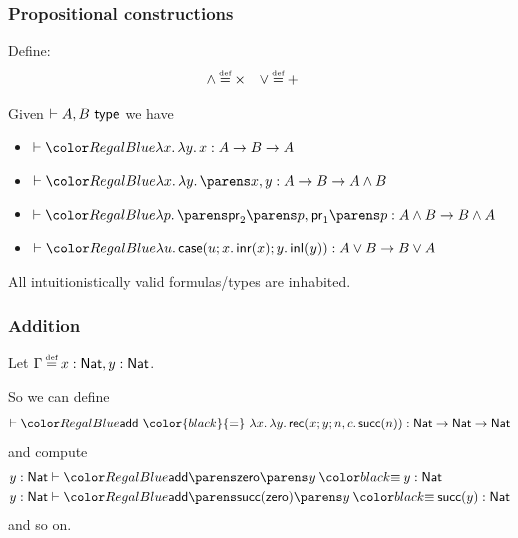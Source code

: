 \documentclass{beamer} %
\begin{document}
\begin{frame}
  \frametitle{Propositional constructions}
  
  \begin{center}
  \end{center}
  Define:
  \begin{align*}
    \land &\defeq \times
    &
    \lor &\defeq +
  \end{align*}
  
  \medskip
  
  Given $\IsTy[]{A, B}[]$ we have
  
  \begin{itemize}
    \item $\IsTm[]{\Lam{x}{\Lam{y}{x}}}{A \to B \to A}$
    \item $\IsTm[]{\Lam{x}{\Lam{y}{\Pair{x}{y}}}}{A \to B \to A \land B}$
    \item $\IsTm[]{\Lam{p}{\Pair{\Proj[2]{p}}{\Proj[1]{p}}}}{A \land B \to B \land A}$
    \item $\IsTm[]{\Lam{u}{\Case{u}{x}{\Inr{x}}{y}{\Inl{y}}}}{A \lor B \to B \lor A}$
  \end{itemize}
  
  \begin{theorem}
    All intuitionistically valid formulas/types are inhabited.
  \end{theorem}
\end{frame}

\begin{frame}
  \frametitle{Addition}
  
  Let $\Gamma \defeq x : \Nat, y : \Nat$.
  \begin{mathpar}
    \small
  \end{mathpar}
  
  So we can define
  \[
    \IsTm[]{\textsf{add}\ {\color{black}{=}}\
      \Lam{x}{\Lam{y}{
        \NatRec{x}{y}{n}{c}{\Succ{n}}
      }}}{\Nat \to \Nat \to \Nat}
  \]
  and compute
  \begin{align*}
    &\IsTm[y : \Nat]{
      \App{\App{\textsf{add}}{\Zero}}{y}
        \deq
      y
    }{\Nat}
    \\
    &\IsTm[y : \Nat]{
      \App{\App{\textsf{add}}{\Succ{\Zero}}}{y}
        \deq
      \Succ{y}
    }{\Nat}
  \end{align*}
  and so on.
\end{frame}
\end{document}

